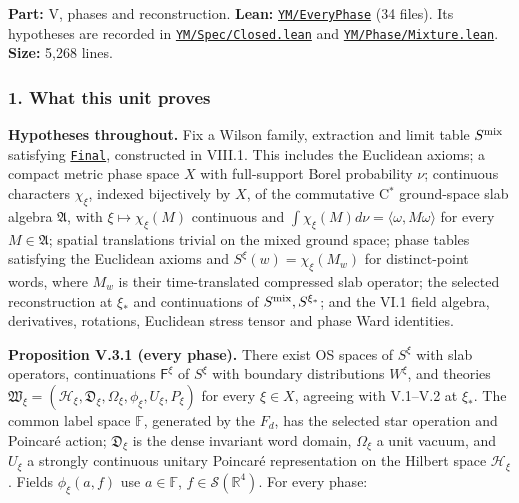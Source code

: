 \documentclass[
  letterpaper,
  11pt]{article}
\begin{document}
\textbf{Part:} V, phases and reconstruction. \textbf{Lean:}
\href{https://github.com/yang-mills-group/OpenAI-YM-20261028/tree/3456e5e75cf8d4cd558955a5c7638fba2d68f464/YM/EveryPhase}{\texttt{YM/EveryPhase}}
(34 files). Its hypotheses are recorded in
\href{https://github.com/yang-mills-group/OpenAI-YM-20261028/blob/3456e5e75cf8d4cd558955a5c7638fba2d68f464/YM/Spec/Closed.lean\#L20-L73}{\texttt{YM/Spec/Closed.lean}}
and
\href{https://github.com/yang-mills-group/OpenAI-YM-20261028/blob/3456e5e75cf8d4cd558955a5c7638fba2d68f464/YM/Phase/Mixture.lean\#L65-L148}{\texttt{YM/Phase/Mixture.lean}}.
\textbf{Size:} 5,268 lines.

\subsubsection{1. What this unit proves}\label{what-this-unit-proves-22}

\textbf{Hypotheses throughout.} Fix a Wilson family, extraction and
limit table \(S^{\rm mix}\) satisfying
\href{https://github.com/yang-mills-group/OpenAI-YM-20261028/blob/3456e5e75cf8d4cd558955a5c7638fba2d68f464/YM/Spec/Closed.lean\#L64-L73}{\texttt{Final}},
constructed in VIII.1. This includes the Euclidean axioms; a compact
metric phase space \(X\) with full-support Borel probability \(\nu\);
continuous characters \(\chi_\xi\), indexed bijectively by \(X\), of the
commutative C\(^*\) ground-space slab algebra \(\mathfrak A\), with
\(\xi\mapsto\chi_\xi(M)\) continuous and
\(\int\chi_\xi(M)d\nu=\langle\omega,M\omega\rangle\) for every
\(M\in\mathfrak A\); spatial translations trivial on the mixed ground
space; phase tables satisfying the Euclidean axioms and
\(S^\xi(w)=\chi_\xi(M_w)\) for distinct-point words, where \(M_w\) is
their time-translated compressed slab operator; the selected
reconstruction at \(\xi_*\) and continuations of
\(S^{\rm mix},S^{\xi_*}\); and the VI.1 field algebra, derivatives,
rotations, Euclidean stress tensor and phase Ward identities.

\textbf{Proposition V.3.1 (every phase).} There exist OS spaces of
\(S^\xi\) with slab operators, continuations \(\mathsf F^\xi\) of
\(S^\xi\) with boundary distributions \(W^\xi\), and theories
\(\mathfrak W_\xi=(\mathcal H_\xi,\mathfrak D_\xi,\Omega_\xi,\phi_\xi,U_\xi,P_\xi)\)
for every \(\xi\in X\), agreeing with V.1--V.2 at \(\xi_*\). The common
label space \(\mathbb F\), generated by the \(F_d\), has the selected
star operation and Poincaré action; \(\mathfrak D_\xi\) is the dense
invariant word domain, \(\Omega_\xi\) a unit vacuum, and \(U_\xi\) a
strongly continuous unitary Poincaré representation on the Hilbert space
\(\mathcal H_\xi\). Fields \(\phi_\xi(a,f)\) use \(a\in\mathbb F\),
\(f\in\mathcal S(\mathbb R^4)\). For every phase:
\end{document}
